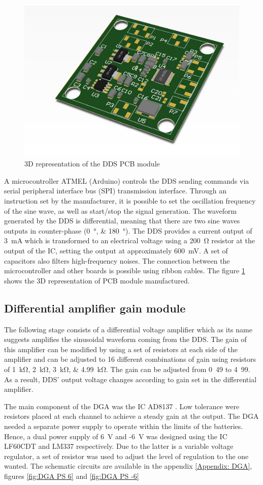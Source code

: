 \begin{figure}[!htpb]
	\centering
	\includegraphics[width=7.5 cm,keepaspectratio]{figure_DDS}
	\caption{3D representation of the DDS PCB module}
	\label{fig:3D DDS}
\end{figure}

A microcontroller ATMEL (Arduino) controls the DDS sending commands via serial peripheral interface bus (SPI) transmission interface. Through an instruction set by the manufacturer, it is possible to set the oscillation frequency of the sine wave, as well as start/stop the signal generation. The waveform generated by the DDS is differential, meaning that there are two sine waves outputs in counter-phase (\SIlist{0;180}{\degree}). The DDS provides a current output of \SI{3}{\mA} which is transformed to an electrical voltage using a \SI{200}{\ohm} resistor at the output of the IC, setting the output at approximately \SI{600}{\mV}. A set of capacitors also filters high-frequency noises. The connection between the microcontroller and other boards is possible using ribbon cables. The figure \ref{fig:3D DDS} shows the 3D representation of PCB module manufactured.

\subsection{Differential amplifier gain module}
The following stage consists of a differential voltage amplifier which as its name suggests amplifies the sinusoidal waveform coming from the DDS. The gain of this amplifier can be modified by using a set of resistors at each side of the amplifier and can be adjusted to 16 different combinations of gain using resistors of \SIlist{1;2;3;4.99}{\kohm}. The gain can be adjusted from \si{0.49} to \si{4.99}. As a result, DDS’ output voltage changes according to gain set in the differential amplifier. 

The main component of the DGA was the IC AD8137 . Low tolerance were resistors placed at each channel to achieve a steady gain at the output. The DGA needed a separate power supply to operate within the limits of the batteries. Hence, a dual power supply of \SI{6}{\volt} and -\SI{6}{\volt} was designed using the IC LF60CDT and LM337 respectively. Due to the latter is a variable voltage regulator, a set of resistor was used to adjust the level of regulation to the one wanted. The schematic circuits are available in the appendix \ref{Appendix: DGA}, figures \ref{fig:DGA PS 6} and \ref{fig:DGA PS -6}

